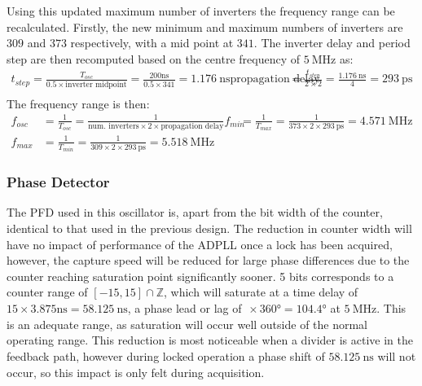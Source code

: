 Using this updated maximum number of inverters the frequency range can be recalculated. Firstly, the new minimum and maximum numbers of inverters are $309$ and $373$ respectively, with a mid point at $341$. The inverter delay and period step are then recomputed based on the centre frequency of $5~\si{\mega\hertz}$ as:
\begin{align}%
t_{step} = \frac{T_{osc}}{0.5\times\text{inverter midpoint}} = \frac{200\si{\nano\second}}{0.5\times 341} = 1.176~\si{\nano\second}
\text{propagation delay} &= \frac{t_{step}}{2\times2} = \frac{1.176~\si{\nano\second}}{4} = 293~\si{\pico\second} \\
\end{align}
The frequency range is then:
\begin{align} %
f_{osc} &= \frac{1}{T_{osc}} = \frac{1}{\text{num. inverters}\times 2\times\text{propagation delay}}
f_{min} &= \frac{1}{T_{max}} = \frac{1}{373\times 2\times 293~\si{\pico\second}} = 4.571~\si{\mega\hertz} \\
f_{max} &= \frac{1}{T_{min}} = \frac{1}{309\times 2\times 293~\si{\pico\second}} = 5.518~\si{\mega\hertz}
\end{align}


\subsubsection{Phase Detector}
The \ac{PFD} used in this oscillator is, apart from the bit width of the counter, identical to that used in the previous design. The reduction in counter width will have no impact of performance of the \ac{ADPLL} once a lock has been acquired, however, the capture speed will be reduced for large phase differences due to the counter reaching saturation point significantly sooner. 5 bits corresponds to a counter range of $[-15,15]\cap\mathbb{Z}$, which will saturate at a time delay of $15\times3.875\si{\nano\second} = 58.125~\si{\nano\second}$, a phase lead or lag of $\frac{}{}\times360\si{\degree} = 104.4\si{\degree}$ at $5~\si{\mega\hertz}$. This is an adequate range, as saturation will occur well outside of the normal operating range. This reduction is most noticeable when a divider is active in the feedback path, however during locked operation a phase shift of $58.125~\si{\nano\second}$ will not occur, so this impact is only felt during acquisition.


